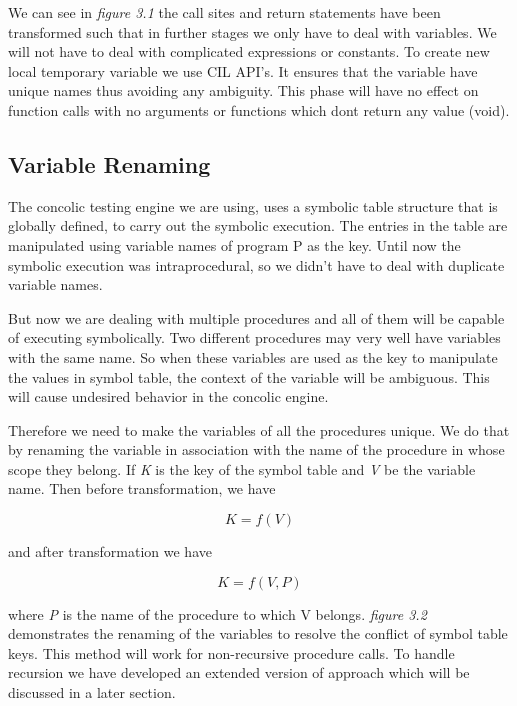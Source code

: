 \documentclass[12pt,oneside]{book}
\begin{document}
We can see in \textit{figure 3.1} the call sites and return statements have been transformed such that in further stages we only have to deal with variables. We will not have to deal with complicated expressions or constants. To create new local temporary variable we use CIL API's. It ensures that the variable have unique names thus avoiding any ambiguity.
This phase will have no effect on function calls with no arguments or functions which dont return any value (void).
\newpage

\subsection{Variable Renaming}
The concolic testing engine we are using, uses a symbolic table structure that is globally defined, to carry out the symbolic execution. The entries in the table are manipulated using variable names of program P as the key. Until now the symbolic execution was intraprocedural, so we didn't have to deal with duplicate variable names.

But now we are dealing with multiple procedures and all of them will be capable of executing symbolically. Two different procedures may very well have variables with the same name. So when these variables are used as the key to manipulate the values in symbol table, the context of the variable will be ambiguous. This will cause undesired behavior in the concolic engine. 

Therefore we need to make the variables of all the procedures unique. We do that by renaming the variable in association with the name of the procedure in whose scope they belong. If \textit{K} is the key of the symbol table and \textit{V} be the variable name. Then before transformation, we have 

\begin{equation}
K = f(V)
\end{equation}

and after transformation we have

\begin{equation}
K = f(V,P)
\end{equation}

where \textit{P} is the name of the procedure to which V belongs. \textit{figure 3.2} demonstrates the renaming of the variables to resolve the conflict of symbol table keys. This method will work for non-recursive procedure calls. To handle recursion we have developed an extended version of approach which will be discussed in a later section.\\
\end{document}
